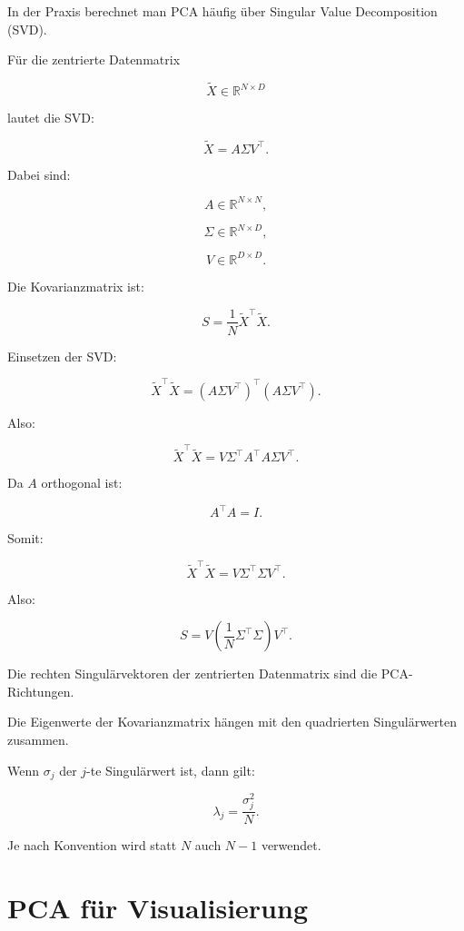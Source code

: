 In der Praxis berechnet man PCA häufig über Singular Value Decomposition (SVD).

Für die zentrierte Datenmatrix

\[
    \tilde{X}
    \in
    \mathbb{R}^{N\times D}
\]

lautet die SVD:

\[
    \tilde{X}
    =
    A\Sigma V^{\top}.
\]

Dabei sind:

\[
    A\in\mathbb{R}^{N\times N},
\]

\[
    \Sigma\in\mathbb{R}^{N\times D},
\]

\[
    V\in\mathbb{R}^{D\times D}.
\]

Die Kovarianzmatrix ist:

\[
    S
    =
    \frac{1}{N}
    \tilde{X}^{\top}\tilde{X}.
\]

Einsetzen der SVD:

\[
    \tilde{X}^{\top}\tilde{X}
    =
    (A\Sigma V^{\top})^{\top}
    (A\Sigma V^{\top}).
\]

Also:

\[
    \tilde{X}^{\top}\tilde{X}
    =
    V\Sigma^{\top}A^{\top}
    A\Sigma V^{\top}.
\]

Da \(A\) orthogonal ist:

\[
    A^{\top}A=I.
\]

Somit:

\[
    \tilde{X}^{\top}\tilde{X}
    =
    V\Sigma^{\top}\Sigma V^{\top}.
\]

Also:

\[
    S
    =
    V
    \left(
        \frac{1}{N}
        \Sigma^{\top}\Sigma
    \right)
    V^{\top}.
\]

\begin{conceptbox}
Die rechten Singulärvektoren der zentrierten Datenmatrix sind die PCA-Richtungen.

Die Eigenwerte der Kovarianzmatrix hängen mit den quadrierten Singulärwerten zusammen.
\end{conceptbox}

Wenn \(\sigma_j\) der \(j\)-te Singulärwert ist, dann gilt:

\[
    \lambda_j
    =
    \frac{\sigma_j^2}{N}.
\]

Je nach Konvention wird statt \(N\) auch \(N-1\) verwendet.

\section{PCA für Visualisierung}

